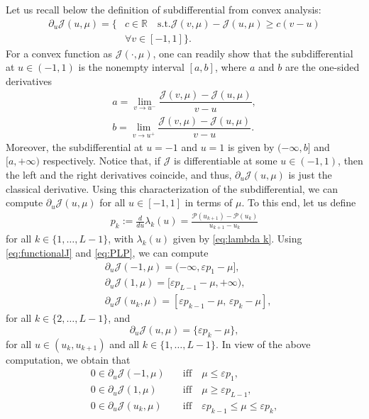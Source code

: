 \documentclass[twocolumn]{autart}    %
\begin{document}
Let us recall below the definition of subdifferential from convex analysis:
\begin{align*}
	\partial_u \mathcal{J} (u,\mu) = \{&c\in \mathbb{R} \quad \text{s.t.} \mathcal{J} (v,\mu) - \mathcal{J} (u,\mu) \geq c(v-u)
	\\
	&\forall v\in [-1,1] \}. 
\end{align*}
For a convex function as $\mathcal{J}(\cdot, \mu)$, one can readily show that the subdifferential at $u\in (-1,1)$ is the nonempty interval $[a,b]$, where $a$ and $b$ are the one-sided derivatives
\begin{align*}
	a = \displaystyle\lim_{v\to u^-} \dfrac{\mathcal{J} (v,\mu) - \mathcal{J}(u,\mu)}{v-u}, 
	\\
	b = \displaystyle\lim_{v\to u^+} \dfrac{\mathcal{J} (v,\mu) - \mathcal{J}(u,\mu)}{v-u}. 
\end{align*}
Moreover, the subdifferential at $u=-1$ and $u=1$ is given by $(-\infty, b]$ and $[a,+\infty)$ respectively.
Notice that, if $\mathcal J$ is differentiable at some $u\in (-1,1)$, then the left and the right derivatives coincide, and thus, $\partial_u \mathcal{J}(u,\mu)$ is just the classical derivative. Using this characterization of the subdifferential, we can compute $\partial_u\mathcal{J}(u,\mu)$ for all $u\in [-1,1]$ in terms of $\mu$. To this end, let us define
\begin{align*} 
	p_k := \frac{d}{du}\lambda_k(u) = \frac{\mathcal{P}(u_{k+1}) - \mathcal{P} (u_k) }{u_{k+1} - u_k} 
\end{align*} 
for all $k\in \{1, \ldots, L-1\}$, with $\lambda_k(u)$ given by \eqref{eq:lambda k}. Using \eqref{eq:functionalJ} and \eqref{eq:PLP}, we can compute
\begin{align*}
	&\partial_u \mathcal{J} (-1,\mu) = (-\infty, \varepsilon p_1 -\mu], 
	\\[5pt]
	&\partial_u \mathcal{J} (1,\mu) = [\varepsilon p_{L-1} -\mu, +\infty), 
	\\[5pt]
	&\partial_u \mathcal{J} (u_k,\mu) = [\varepsilon p_{k-1} -\mu,  \, \varepsilon p_k -\mu],
\end{align*}
for all $k\in \{ 2, \ldots, L-1\}$, and
\begin{equation*}
	\partial_u \mathcal{J}(u,\mu) = \{\varepsilon p_k -\mu\},
\end{equation*}
for all $u\in (u_k, u_{k+1})$ and all $k\in \{ 1, \ldots, L-1 \}$. In view of the above computation, we obtain that
\begin{equation}\label{eq:subdiff}
	\begin{array}{ll}
		0\in \partial_u \mathcal{J} (-1,\mu) & \quad\text{iff}\quad  \mu\leq  \varepsilon p_1, 
		\\[5pt]
		0\in \partial_u \mathcal{J} (1,\mu) & \quad\text{iff} \quad \mu\geq  \varepsilon p_{L-1}, 
		\\[5pt]
		0\in \partial_u \mathcal{J} (u_k,\mu) & \quad\text{iff} \quad  \varepsilon p_{k-1} \leq \mu \leq \varepsilon p_k , 
	\end{array} 
\end{equation}
\end{document}
